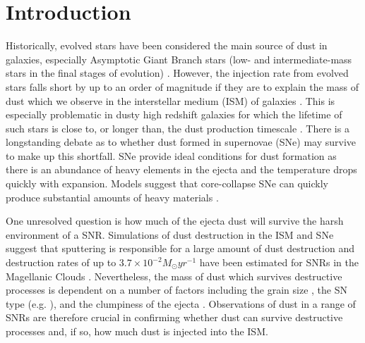 \documentclass[fleqn,usenatbib]{mnras}
\begin{document}
\section{Introduction} \label{Intro}
Historically, evolved stars have been considered the main source of dust in galaxies, especially Asymptotic Giant Branch stars (low- and intermediate-mass stars in the final stages of evolution) \citep[e.g.][]{Dwek1998}. However, the injection rate from evolved stars falls short by up to an order of magnitude if they are to explain the mass of dust which we observe in the interstellar medium (ISM) of galaxies \citep[e.g.][]{Morgan2003, Matsuura2009}. This is especially problematic in dusty high redshift galaxies for which the lifetime of such stars is close to, or longer than, the dust production timescale \citep{Morgan2003, Dwek2007, Michalowski2010, Gall2011, Mancini2015, Rowlands2014, Michalowski2015}. There is a longstanding debate as to whether dust formed in supernovae (SNe) may survive to make up this shortfall. SNe provide ideal conditions for dust formation as there is an abundance of heavy elements in the ejecta and the temperature drops quickly with expansion. Models suggest that core-collapse SNe can quickly produce substantial amounts of heavy materials \citep{Todini2001, Nozawa2003}.

One unresolved question is how much of the ejecta dust will survive the harsh environment of a SNR. Simulations of dust destruction  in the ISM and SNe suggest that sputtering is responsible for a large amount of dust destruction \citep[e.g.][]{Jones1997, Bocchio2014, Micelotta2016} and destruction rates of up to $3.7 \times 10^{-2} M_\odot yr^{-1}$ have been estimated for SNRs in the Magellanic Clouds \citep{Temim2015}. Nevertheless, the mass of dust which survives destructive processes is dependent on a number of factors including the grain size \citep{Nozawa2007}, the SN type (e.g. \citealp{Kozasa2009, Nozawa2010, Biscaro2016}), and the clumpiness of the ejecta \citep[e.g.][]{Biscaro2016}. Observations of dust in a range of SNRs are therefore crucial in confirming whether dust can survive destructive processes and, if so, how much dust is injected into the ISM.
\end{document}
